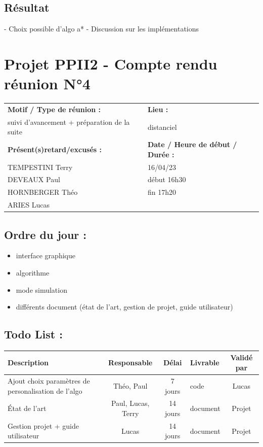 \documentclass[12pt,titlepage]{report}
\begin{document}
\subsection*{Résultat}
- Choix possible d'algo a* 
- Discussion sur les implémentations

\newpage

\section*{Projet PPII2 - Compte rendu réunion N°4}
\begin{tabular}{|p{7cm}|p{6cm}|}
    \hline
    \textbf{Motif / Type de réunion :}
    & \textbf{Lieu :}
    \\
    suivi d'avancement + préparation de la suite 
    & 
    distanciel
    \\ \hline
    \textbf{Présent(s)retard/excusés :}
    &
    \textbf{Date / Heure de début / Durée :}
    \\ 
    TEMPESTINI Terry &  16/04/23\\  
    DEVEAUX Paul & début 16h30\\
    HORNBERGER Théo & fin 17h20\\
    ARIES Lucas & 
    \\ \hline
\end{tabular}

\subsection*{Ordre du jour :}
\begin{itemize}
    \item{interface graphique}
    \item{algorithme}
    \item{mode simulation}
    \item{différents document (état de l'art, gestion de projet, guide utilisateur)}
\end{itemize}

\subsection*{Todo List :}
\begin{tabular}{|p{3.5cm}|c|c|p{4.5cm}|c|}
    \hline 
    Description & Responsable & Délai & Livrable & Validé par 
    \\ \hline
    Ajout choix paramètres de personalisation de l'algo & Théo, Paul & 7 jours & code & Lucas \\ \hline
    État de l'art & Paul, Lucas, Terry & 14 jours & document & Projet \\ \hline
    Gestion projet + guide utilisateur & Lucas & 14 jours & document & Projet
    \\ \hline
\end{tabular}
\end{document}
